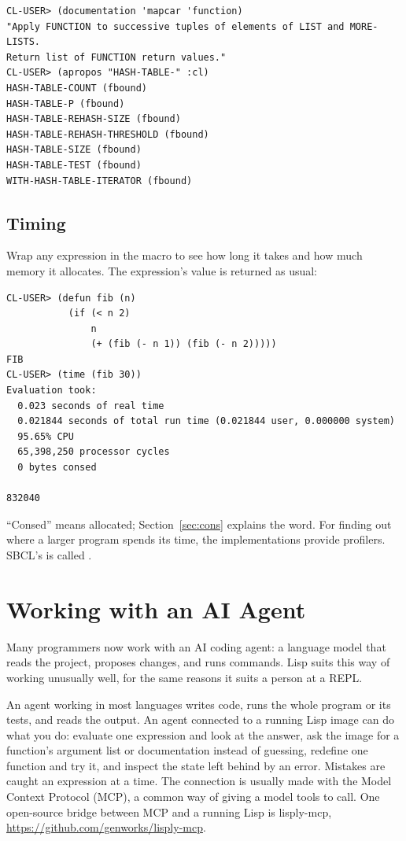 \begin{verbatim}
CL-USER> (documentation 'mapcar 'function)
"Apply FUNCTION to successive tuples of elements of LIST and MORE-LISTS.
Return list of FUNCTION return values."
CL-USER> (apropos "HASH-TABLE-" :cl)
HASH-TABLE-COUNT (fbound)
HASH-TABLE-P (fbound)
HASH-TABLE-REHASH-SIZE (fbound)
HASH-TABLE-REHASH-THRESHOLD (fbound)
HASH-TABLE-SIZE (fbound)
HASH-TABLE-TEST (fbound)
WITH-HASH-TABLE-ITERATOR (fbound)
\end{verbatim}

\subsection{Timing}

Wrap any expression in the  macro to see how long it takes
and how much memory it allocates. The expression's value is returned
as usual:

\begin{verbatim}
CL-USER> (defun fib (n)
           (if (< n 2)
               n
               (+ (fib (- n 1)) (fib (- n 2)))))
FIB
CL-USER> (time (fib 30))
Evaluation took:
  0.023 seconds of real time
  0.021844 seconds of total run time (0.021844 user, 0.000000 system)
  95.65% CPU
  65,398,250 processor cycles
  0 bytes consed

832040
\end{verbatim}

``Consed'' means allocated; Section~\ref{sec:cons} explains the word.
For finding out where a larger program spends its time, the
implementations provide profilers. SBCL's is called
.

\section{Working with an AI Agent}
\label{sec:agents}

Many programmers now work with an AI coding agent: a language model
that reads the project, proposes changes, and runs commands. Lisp
suits this way of working unusually well, for the same reasons it
suits a person at a REPL.

An agent working in most languages writes code, runs the whole program
or its tests, and reads the output. An agent connected to a running
Lisp image can do what you do: evaluate one expression and look at the
answer, ask the image for a function's argument list or documentation
instead of guessing, redefine one function and try it, and inspect the
state left behind by an error. Mistakes are caught an expression at a
time. The connection is usually made with the Model Context
Protocol (MCP), a common way of giving a model tools to call. One
open-source bridge between MCP and a running Lisp is lisply-mcp,
\url{https://github.com/genworks/lisply-mcp}.

